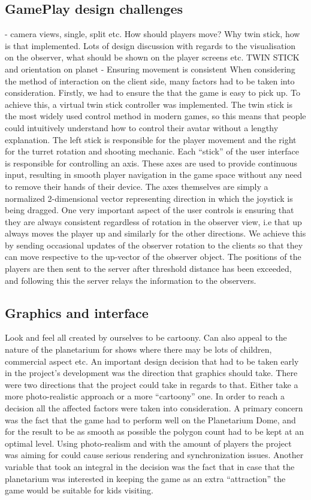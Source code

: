 \documentclass[11pt,a4paper]{article}
\begin{document}
     \subsection{GamePlay design challenges}
      - camera views, single, split etc. How should players move? Why twin stick, how is that implemented. Lots of design discussion with regards to the visualisation on the observer, what should be shown on the player screens etc.
      TWIN STICK and orientation on planet
       - Ensuring movement is consistent
       When considering the method of interaction on the client side, many factors had to be taken into consideration. Firstly, we had to ensure the that the game is easy to pick up. To achieve this, a virtual twin stick controller was implemented. The twin stick is the most widely used control method in modern games, so this means that people could intuitively understand how to control their avatar without a lengthy explanation. The left stick is responsible for the player movement and the right for the turret rotation and shooting mechanic. 
       Each “stick” of the user interface is responsible for controlling an axis. These axes are used to provide continuous input, resulting in smooth player navigation in the game space without any need to remove their hands of their device. The axes themselves are simply a normalized 2-dimensional vector representing direction in which the joystick is being dragged.
       One very important aspect of the user controls is ensuring that they are always consistent regardless of rotation in the observer view, i.e that up always moves the player up and similarly for the other directions. We achieve this by sending occasional updates of the observer rotation to the clients so that they can move respective to the up-vector of the observer object. The positions of the players are then sent to the server after threshold distance has been exceeded, and following this the server relays the information to the observers.

       \subsection{Graphics and interface}
       Look and feel all created by ourselves to be cartoony.
        Can also appeal to the nature of the planetarium for shows where there may be lots of children, commercial aspect etc.
        An important design decision that had to be taken early in the project's development was the direction that graphics should take. There were two directions that the project could take in regards to that. Either take a more photo-realistic approach or a more “cartoony” one. In order to reach a decision all the affected factors were taken into consideration. A primary concern was the fact that the game had to perform well on the Planetarium Dome, and for the result to be as smooth as possible the polygon count had to be kept at an optimal level. Using photo-realism and with the amount of players the project was aiming for could cause serious rendering and synchronization issues.
        Another variable that took an integral in the decision was the fact that in case that the planetarium was interested in keeping the game as an extra “attraction” the game would be suitable for kids visiting.
\end{document}
